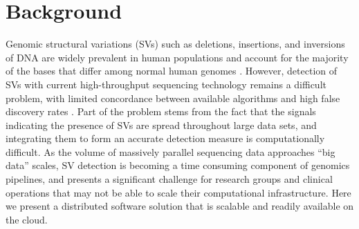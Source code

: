 \documentclass[10pt]{bmc_article}
\newenvironment{bmcformat}{\fussy\setboolean{publ}{true}}{\fussy}
\begin{document}
\begin{bmcformat}




\section*{Background}

Genomic structural variations (SVs) such as deletions, insertions, and inversions of DNA are widely prevalent in human populations and account for the majority of the bases that differ among normal human genomes \cite{Mills:2011p1611, Conrad:2010ja}. However, detection of SVs with current high-throughput sequencing technology remains a difficult problem, with limited concordance between available algorithms and high false discovery rates \cite{Mills:2011p1611}. Part of the problem stems from the fact that the signals indicating the presence of SVs are spread throughout large data sets, and integrating them to form an accurate detection measure is computationally difficult. As the volume of massively parallel sequencing data approaches ``big data'' scales, SV detection is becoming a time consuming component of genomics pipelines, and presents a significant challenge for research groups and clinical operations that may not be able to scale their computational infrastructure. Here we present a distributed software solution that is scalable and readily available on the cloud.


\end{bmcformat}
\end{document}

